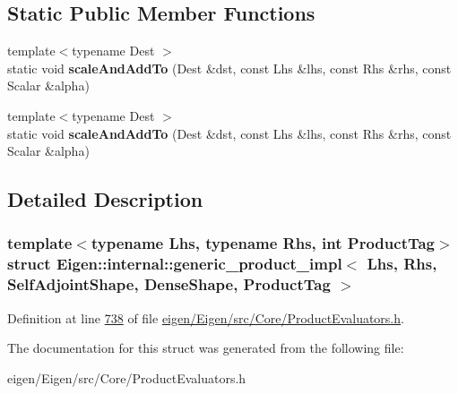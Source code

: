\subsection*{Static Public Member Functions}
\begin{DoxyCompactItemize}
\item 
\mbox{\label{struct_eigen_1_1internal_1_1generic__product__impl_3_01_lhs_00_01_rhs_00_01_self_adjoint_shape_06e3f81c44c9a89e35e47ffcd48d159f9_ae91451cb1d24f97370f1d3d87564ab6b}} 
{\footnotesize template$<$typename Dest $>$ }\\static void {\bfseries scale\+And\+Add\+To} (Dest \&dst, const Lhs \&lhs, const Rhs \&rhs, const Scalar \&alpha)
\item 
\mbox{\label{struct_eigen_1_1internal_1_1generic__product__impl_3_01_lhs_00_01_rhs_00_01_self_adjoint_shape_06e3f81c44c9a89e35e47ffcd48d159f9_ae91451cb1d24f97370f1d3d87564ab6b}} 
{\footnotesize template$<$typename Dest $>$ }\\static void {\bfseries scale\+And\+Add\+To} (Dest \&dst, const Lhs \&lhs, const Rhs \&rhs, const Scalar \&alpha)
\end{DoxyCompactItemize}


\subsection{Detailed Description}
\subsubsection*{template$<$typename Lhs, typename Rhs, int Product\+Tag$>$\newline
struct Eigen\+::internal\+::generic\+\_\+product\+\_\+impl$<$ Lhs, Rhs, Self\+Adjoint\+Shape, Dense\+Shape, Product\+Tag $>$}



Definition at line \hyperlink{eigen_2_eigen_2src_2_core_2_product_evaluators_8h_source_l00738}{738} of file \hyperlink{eigen_2_eigen_2src_2_core_2_product_evaluators_8h_source}{eigen/\+Eigen/src/\+Core/\+Product\+Evaluators.\+h}.



The documentation for this struct was generated from the following file\+:\begin{DoxyCompactItemize}
\item 
eigen/\+Eigen/src/\+Core/\+Product\+Evaluators.\+h\end{DoxyCompactItemize}
